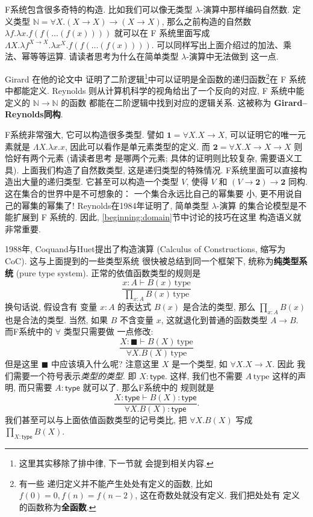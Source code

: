 \documentclass[UTF8]{ctexbook}
\newcommand{\cons}[1]{\textsf{#1}}
\theoremstyle{plain}
\theoremstyle{definition}
\theoremstyle{remark}
\begin{document}
F系统包含很多奇特的构造. 比如我们可以像无类型
\(\lambda\)-演算中那样编码自然数. 定义类型
\(\mathbb N = \forall X. (X \to X) \to (X \to X)\),
那么之前构造的自然数 \(\lambda f. \lambda x. f(f(\dots(f(x))))\)
就可以在 F 系统里面写成
\(\Lambda X. \lambda f^{X\to X}. \lambda x^X. f(f(\dots(f(x))))\).
可以同样写出上面介绍过的加法、乘法、幂等等运算.
请读者思考为什么在简单类型 \(\lambda\)-演算中无法做到
这一点.

Girard 在他的论文\cite{girard:1972:systemf}中
证明了二阶逻辑\footnote{这里其实移除了排中律, 下一节就
会提到相关内容.}中可以证明是全函数的递归函数\footnote{有一些
递归定义并不能产生处处有定义的函数, 比如 \(f(0) = 0,
f(n) = f(n-2)\), 这在奇数处就没有定义. 我们把处处有
定义的函数称为\textbf{全函数}.}在 F 系统中都能定义.
Reynolds 则从计算机科学的视角给出了一个反向的对应,
F 系统中能定义的 \(\mathbb N \to \mathbb N\) 的函数
都能在二阶逻辑中找到对应的逻辑关系. 这被称为
\textbf{Girard--Reynolds同构}.

F系统非常强大, 它可以构造很多类型. 譬如 \(\mathbf 1 =
\forall X. X \to X\), 可以证明它的唯一元素就是 \(\Lambda X. \lambda x. x\),
因此可以看作是单元素类型的定义. 而 \(\mathbf 2 =
\forall X. X \to X \to X\) 则恰好有两个元素 (请读者思考
是哪两个元素; 具体的证明则比较复杂, 需要语义工具).
上面我们构造了自然数类型, 这是递归类型的特殊情况.
F系统里面可以直接构造出大量的递归类型\cite{wadler:1990:free}.
它甚至可以构造一个类型 \(V\),
使得 \(V\) 和 \((V \to \mathbf 2) \to \mathbf 2\) 同构.
这在集合的世界中是不可想象的： 一个集合永远比自己的幂集要
小, 更不用说自己的幂集的幂集了!
Reynolds在1984年证明了, 简单类型 \(\lambda\)-演算
的集合论模型是不能扩展到 F 系统的\cite{reynolds:1984:polymorphism}.
因此, \ref{beginning:domain}节中讨论的技巧在这里
构造语义就非常重要.

1988年, Coquand与Huet提出了构造演算 (Calculus of
Constructions, 缩写为 CoC). 这与上面提到的一些类型系统
很快被总结到同一个框架下, 统称为\textbf{纯类型系统}
(pure type system)\cite{barendregt:1992:lambda}.
正常的依值函数类型的规则是
\[\frac{x{:}A \vdash B(x)\,\text{type}}{\prod_{x:A}B(x)\,\text{type}}\]
换句话说, 假设含有
变量 \(x : A\) 的表达式 \(B(x)\) 是合法的类型,
那么 \(\prod_{x:A}B(x)\) 也是合法的类型. 当然,
如果 \(B\) 不含变量 \(x\), 这就退化到普通的函数类型
\(A \to B\). 而F系统中的 \(\forall\) 类型只需要做
一点修改:
\[\frac{X{:} \blacksquare \vdash B(X)\,\text{type}}{\forall X. B(X)\,\text{type}}\]
但是这里 \(\blacksquare\) 中应该填入什么呢? 注意这里
\(X\) 是一个类型, 如 \(\forall X. X \to X\). 因此
我们需要一个符号表示\emph{类型的类型}. 即 \(X : \cons{type}\).
这样, 我们也不需要 \(A\,\text{type}\) 这样的声明,
而只需要 \(A : \cons{type}\) 就可以了. 那么F系统中的
规则就是
\[\frac{X{:}\cons{type} \vdash B(X):\cons{type}}{\forall X. B(X) : \cons{type}}.\]
我们甚至可以与上面依值函数类型的记号类比, 把 \(\forall X. B(X)\)
写成 \(\prod_{X : \cons{type}} B(X)\).
\end{document}
